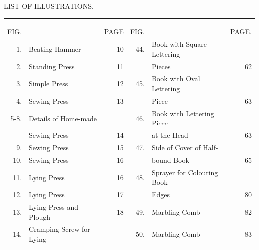 \documentclass[twoside]{book}
\begin{document}
\pagebreak

\vspace*{\fill}

\begin{center}\begin{Large}LIST OF ILLUSTRATIONS.\end{Large}\end{center}

\begin{center}\rule{0.5cm}{1pt.}\end{center}

\begin{tiny}

\begin{tabular}{r l r r l r }
FIG.  & & PAGE                              &   FIG. &                                    & PAGE. \\
1.     & Beating Hammer            \dotfill & 10     &    44. & Book with Square Lettering           &     \\ 
2.     & Standing Press            \dotfill & 11     &        & Pieces                      \dotfill &  62 \\ 
3.     & Simple Press              \dotfill & 12     &    45. & Book with Oval Lettering             &     \\ 
4.     & Sewing Press              \dotfill & 13     &        & Piece                       \dotfill &  63 \\ 
5-8.   & Details of Home-made               &        &    46. & Book with Lettering Piece            &     \\ 
       & Sewing Press              \dotfill & 14     &        & at the Head                 \dotfill &  63 \\ 
 9.    & Sewing Press              \dotfill & 15     &    47. & Side of Cover of Half-               &     \\ 
10.    & Sewing Press              \dotfill & 16     &        & bound Book                  \dotfill &  65 \\ 
11.    & Lying Press               \dotfill & 16     &    48. & Sprayer for Colouring Book           &     \\ 
12.    & Lying Press               \dotfill & 17     &        & Edges                       \dotfill &  80 \\ 
13.    & Lying Press and Plough    \dotfill & 18     &    49. & Marbling Comb               \dotfill &  82 \\ 
14.    & Cramping Screw for Lying           &        &    50. & Marbling Comb               \dotfill &  83 \\ 

\end{tabular}
\end{tiny}
\end{document}
